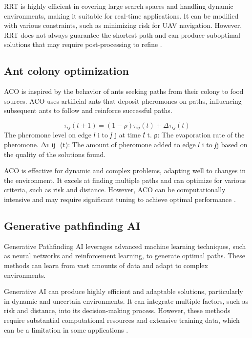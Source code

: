\documentclass[12pt]{report}
\begin{document}
        RRT is highly efficient in covering large search spaces and handling dynamic environments, making it suitable
        for real-time applications. It can be modified with various constraints, such as minimizing risk for UAV
        navigation. However, RRT does not always guarantee the shortest path and can produce suboptimal solutions that
        may require post-processing to refine \cite{lavalle_planning_2006}.

        \subsection{Ant colony optimization}
        \ac{ACO} is inspired by the behavior of ants seeking paths from their colony to food
        sources. ACO uses artificial ants that deposit pheromones on paths, influencing subsequent ants to follow and
        reinforce successful paths.
        
        \begin{equation}
            \tau_{ij}(t+1) = (1 - \rho) \tau_{ij}(t) + \Delta\tau_{ij}(t)
        \end{equation}
The pheromone level on edge 𝑖 i to 𝑗 j at time 𝑡 t.
ρ: The evaporation rate of the pheromone.
Δτ ij ​ (t): The amount of pheromone added to edge 𝑖 i to 𝑗j based on the quality of the solutions found.
                
        ACO is effective for dynamic and complex problems, adapting well to changes in the environment. It excels at
        finding multiple paths and can optimize for various criteria, such as risk and distance. However, ACO can be
        computationally intensive and may require significant tuning to achieve optimal performance
        \cite{dorigo_ant_2004}.

        \subsection{Generative pathfinding AI}
        Generative Pathfinding AI leverages advanced machine learning techniques, such as neural networks and
        reinforcement learning, to generate optimal paths. These methods can learn from vast amounts of data and adapt
        to complex environments.
                
        Generative AI can produce highly efficient and adaptable solutions, particularly in dynamic and uncertain
        environments. It can integrate multiple factors, such as risk and distance, into its decision-making process.
        However, these methods require substantial computational resources and extensive training data, which can be a
        limitation in some applications \cite{silver_mastering_2016}.
\end{document}
